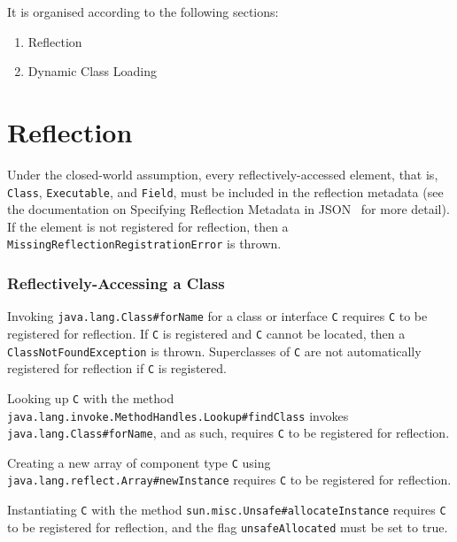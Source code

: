 It is organised according to the following sections:
\begin{enumerate}
    \item Reflection
    \item Dynamic Class Loading
\end{enumerate}

\section{Reflection}\label{reflection_specs}
Under the closed-world assumption, every reflectively-accessed element, that is, \texttt{Class}, \texttt{Executable}, and \texttt{Field}, must be included in the reflection metadata (see the documentation on Specifying Reflection Metadata in JSON~\cite{noauthor_reachability_nodate} for more detail). If the element is not registered for reflection, then a \texttt{MissingReflectionRegistrationError} is thrown.

\subsubsection{Reflectively-Accessing a Class}
Invoking \texttt{java.lang.Class\#forName} for a class or interface \verb|C| requires \verb|C| to be registered for reflection. If \verb|C| is registered and \verb|C| cannot be located, then a \texttt{ClassNotFoundException} is thrown. Superclasses of \verb|C| are not automatically registered for reflection if \verb|C| is registered.

Looking up \verb|C| with the method \texttt{java.lang.invoke.MethodHandles.Lookup\#findClass} invokes \texttt{java.lang.Class\#forName}, and as such, requires \verb|C| to be registered for reflection.

Creating a new array of component type \verb|C| using \texttt{java.lang.reflect.Array\#newInstance} requires \verb|C| to be registered for reflection.

Instantiating \verb|C| with the method \texttt{sun.misc.Unsafe\#allocateInstance} requires \verb|C| to be registered for reflection, and the flag \texttt{unsafeAllocated} must be set to true.

